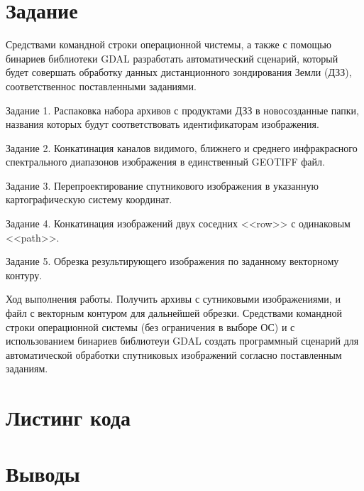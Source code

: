 \chapter{Задание}

Средствами командной строки операционной чистемы, а также с помощью бинариев библиотеки GDAL разработать автоматический сценарий, который будет совершать обработку данных дистанционного зондирования Земли (ДЗЗ), соответственнос поставленными заданиями.

Задание 1. Распаковка набора архивов с продуктами ДЗЗ в новосозданные папки, названия которых будут соответствовать идентификаторам изображения.

Задание 2. Конкатинация каналов видимого, ближнего и среднего инфракрасного спектрального диапазонов изображения в единственный GEOTIFF файл.

Задание 3. Перепроектирование спутникового изображения в указанную картографическую систему координат.

Задание 4. Конкатинация изображений двух соседних <<row>> с одинаковым <<path>>.

Задание 5. Обрезка результирующего изображения по заданному векторному контуру.

Ход выполнения работы. Получить архивы с сутниковыми изображениями, и файл с векторным контуром для дальнейшей обрезки. Средствами командной строки операционной системы (без ограничения в выборе ОС) и с использованием бинариев библиотеуи GDAL создать программный сценарий для автоматической обработки спутниковых изображений согласно поставленным заданиям. 

\chapter{Листинг кода}


\chapter*{Выводы}

\clearpage
{}
{}
\renewcommand\bibname{Список литературы}



